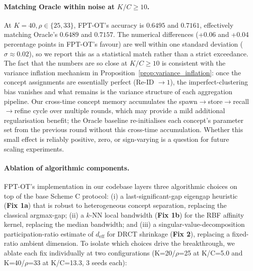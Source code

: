 \paragraph{Matching Oracle within noise at $K/C \ge 10$.}
At $K = 40, \rho \in \{25, 33\}$, FPT-OT's accuracy is $0.6495$ and $0.7161$, effectively matching Oracle's $0.6489$ and $0.7157$. The numerical differences (+0.06 and +0.04 percentage points in FPT-OT's favour) are well within one standard deviation ($\sigma \approx 0.02$), so we report this as a statistical match rather than a strict exceedance. The fact that the numbers are so close at $K/C \ge 10$ is consistent with the variance inflation mechanism in Proposition~\ref{prop:variance_inflation}: once the concept assignments are essentially perfect (Re-ID $\to 1$), the imperfect-clustering bias vanishes and what remains is the variance structure of each aggregation pipeline. Our cross-time concept memory accumulates the spawn$\to$store$\to$recall$\to$refine cycle over multiple rounds, which may provide a mild additional regularisation benefit; the Oracle baseline re-initialises each concept's parameter set from the previous round without this cross-time accumulation. Whether this small effect is reliably positive, zero, or sign-varying is a question for future scaling experiments.

\paragraph{Ablation of algorithmic components.}
FPT-OT's implementation in our codebase layers three algorithmic choices on top of the base Scheme C protocol: (i) a last-significant-gap eigengap heuristic (\textbf{Fix 1a}) that is robust to heterogeneous concept separation, replacing the classical argmax-gap; (ii) a $k$-NN local bandwidth (\textbf{Fix 1b}) for the RBF affinity kernel, replacing the median bandwidth; and (iii) a singular-value-decomposition participation-ratio estimate of $d_{\mathrm{eff}}$ for DRCT shrinkage (\textbf{Fix 2}), replacing a fixed-ratio ambient dimension. To isolate which choices drive the breakthrough, we ablate each fix individually at two configurations (K=20/$\rho$=25 at K/C=5.0 and K=40/$\rho$=33 at K/C=13.3, 3 seeds each):

